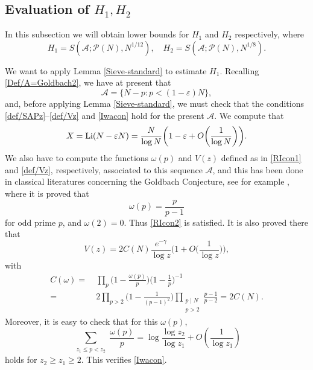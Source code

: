 \documentclass[12pt, a4paper]{amsart}
\def\Li{\hbox{{\rm Li}}}
\def\le{\leqslant}
\def\ge{\geqslant}
\theoremstyle{plain}
\theoremstyle{remark}
\numberwithin{equation}{section}
\begin{document}
\subsection{Evaluation of $H_1,H_2$}
In this subsection we will obtain lower bounds for $H_1$ and $H_2$ respectively, where
\[
H_1 = S(\mathscr{A}; \mathscr{P}(N), N^{1/12}), \quad 
H_2 = S(\mathscr{A}; \mathscr{P}(N), N^{1/8}).
\]

We want to apply Lemma \ref{Sieve-standard} to estimate $H_1$. Recalling \eqref{Def/A=Goldbach2}, 
we have at present that
\begin{equation}\label{New/A=Goldbach4}
\mathscr{A}=\{N-p:p<(1-\varepsilon)N\},
\end{equation}
and, before applying Lemma \ref{Sieve-standard}, we must check that the conditions
\eqref{def/SAPz}--\eqref{def/Vz} and \eqref{Iwacon} hold for the present $\mathscr{A}$. We compute that
\begin{equation}\label{H1X}
X=\Li(N-\varepsilon N)=\dfrac{N}{\log N}\bigg(1-\varepsilon+O\bigg(\dfrac{1}{\log N}\bigg)\bigg).
\end{equation}
We also have to compute the functions $\omega(p)$ and $V(z)$ defined as in \eqref{RIcon1} and \eqref{def/Vz}, respectively,
associated to this sequence $\mathscr{A}$, and
this has been done in classical literatures concerning the Goldbach Conjecture,
see for example \cite[\S1.3, Example 5]{HR74}, where it is proved that
\begin{equation}\label{New/ome/p-small}
\omega(p)= \frac{p}{p-1}
\end{equation}
for odd prime $p$, and $\omega(2)=0$. Thus \eqref{RIcon2} is satisfied.
It is also proved there that
\begin{equation}\label{Vz/Small}
V(z) = 2C(N) \frac{e^{-\gamma}}{\log z} \bigg(1 + O\bigg(\frac{1}{\log z}\bigg)\bigg),
\end{equation}
with
\begin{equation}\label{Come/Small}
\begin{aligned}
C(\omega) 
=&\  \prod_p \bigg(1 - \frac{\omega(p)}{p}\bigg) \bigg(1 - \frac{1}{p}\bigg)^{-1} \\ 
=&\ 2 \prod_{p > 2} \bigg(1 - \frac{1}{(p-1)^2}\bigg) \prod_{\substack{p \mid N \\ p > 2}} \frac{p-1}{p-2}
= 2C(N).
\end{aligned}
\end{equation}
Moreover, it is easy to check that for this $\omega(p)$,
\begin{equation}\label{Vz1/Vz2/H1}
\sum_{\substack{z_1 \le p < z_2}} \frac{\omega(p)}{p} = \log \frac{\log z_2}{\log z_1} 
+ O\left(\frac{1}{\log z_1}\right)
\end{equation}
holds for $z_2 \ge z_1 \ge 2$. This verifies \eqref{Iwacon}.
\end{document}
